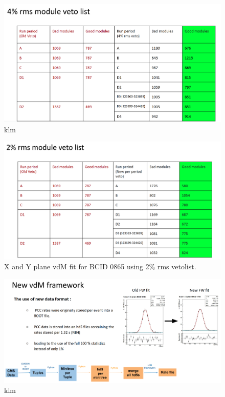 \begin{figure}[!htp]
\centering
\includegraphics[width=1\textwidth]{ashish_thesis/4per_rms_veto.png}
\caption{%
   klm
}
\label{fig:4per_veto}
\end{figure}


\begin{figure}[!htp]
\centering
\includegraphics[width=1\textwidth]{ashish_thesis/2per_rms_veto.png}
\caption{%
   X and Y plane vdM fit for BCID 0865 using 2\% rms  vetolist.
}
\label{fig:2per_veto}
\end{figure}



\begin{figure}[!htp]
\centering
\includegraphics[width=|\textwidth]{ashish_thesis/new_framework_vdm.png}
\caption{%
   klm
}
\label{fig:vdm_new_f}
\end{figure}


